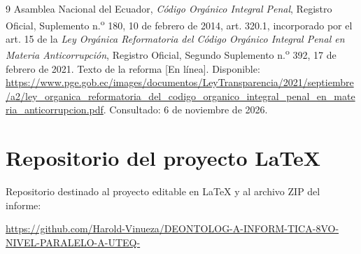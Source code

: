 \documentclass[12pt,a4paper,oneside]{article}
\begin{document}
\begin{thebibliography}{9}
Asamblea Nacional del Ecuador,
\emph{C\'odigo Org\'anico Integral Penal},
Registro Oficial, Suplemento n.\textsuperscript{o} 180, 10 de febrero de 2014,
art. 320.1, incorporado por el art. 15 de la \emph{Ley Org\'anica Reformatoria del C\'odigo Org\'anico Integral Penal en Materia Anticorrupci\'on},
Registro Oficial, Segundo Suplemento n.\textsuperscript{o} 392, 17 de febrero de 2021.
Texto de la reforma [En l\'inea]. Disponible: \url{https://www.pge.gob.ec/images/documentos/LeyTransparencia/2021/septiembre/a2/ley_organica_reformatoria_del_codigo_organico_integral_penal_en_materia_anticorrupcion.pdf}.
Consultado: 6 de noviembre de 2026.

\end{thebibliography}

\clearpage
\section*{Repositorio del proyecto LaTeX}

Repositorio destinado al proyecto editable en LaTeX y al archivo ZIP del informe:

\begingroup
\fontsize{10}{12}\selectfont
\mbox{\url{https://github.com/Harold-Vinueza/DEONTOLOG-A-INFORM-TICA-8VO-NIVEL-PARALELO-A-UTEQ-}}
\par\endgroup
\end{document}
